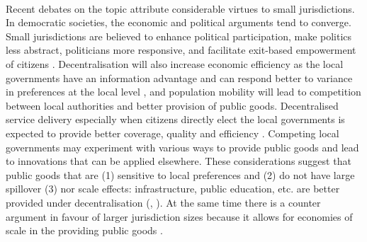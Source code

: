 \documentclass[12pt, a4paper]{article}
\begin{document}
\paragraph{}  Recent debates on the topic attribute considerable virtues to small jurisdictions. In democratic societies, the economic and political arguments tend to converge. Small jurisdictions are believed to enhance political participation, make politics less abstract, politicians more responsive, and facilitate exit-based empowerment of citizens \parencite{hansen_size_2014}. Decentralisation will also increase economic efficiency as the local governments have an information advantage and can respond better to variance in preferences at the local level \parencite{oates_fiscal_1972}, and population mobility will lead to competition between local authorities and better provision of public goods. Decentralised service delivery especially when citizens directly elect the local governments is expected to provide better coverage, quality and efficiency \parencite{smoke2015rethinking}. Competing local governments may experiment with various ways to provide public goods and lead to innovations that can be applied elsewhere. These considerations suggest that public goods that are (1) sensitive to local preferences and (2) do not have large spillover (3) nor scale effects: infrastructure, public education, etc. are better provided under decentralisation (\cite{tiebout_economies_1960}, \cite{oates_fiscal_1972}). At the same time there is a counter argument in favour of larger jurisdiction sizes because it allows for economies of scale in the providing public goods \parencite{hirsch_expenditure_1959}. 
\end{document}
